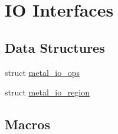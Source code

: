 \hypertarget{group__io}{}\section{IO Interfaces}
\label{group__io}
\subsection*{Data Structures}
\begin{DoxyCompactItemize}
\item 
struct \hyperlink{structmetal__io__ops}{metal\+\_\+io\+\_\+ops}
\item 
struct \hyperlink{structmetal__io__region}{metal\+\_\+io\+\_\+region}
\end{DoxyCompactItemize}
\subsection*{Macros}
